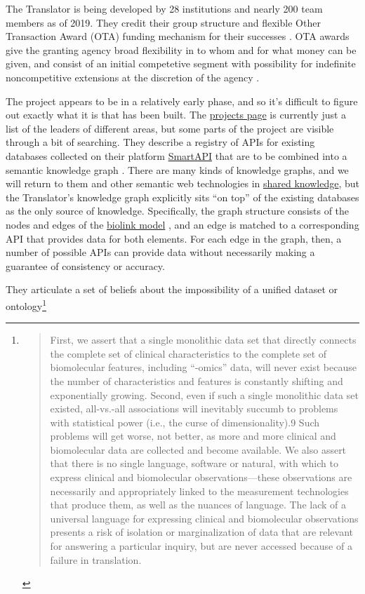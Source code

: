 \documentclass[10pt]{article}
\begin{document}
\begin{multicols}{2}
The Translator is being developed by 28 institutions and nearly 200 team
members as of 2019. They credit their group structure and flexible Other
Transaction Award (OTA) funding mechanism for their successes \cite{consortiumBiomedicalDataTranslator2019} . OTA awards give the
granting agency broad flexibility in to whom and for what money can be
given, and consist of an initial competetive segment with possibility
for indefinite noncompetitive extensions at the discretion of the agency
\cite{fleisherOtherTransactionAward2019} .

The project appears to be in a relatively early phase, and so it's
difficult to figure out exactly what it is that has been built. The
\href{https://web.archive.org/web/20211210023403/https://ncats.nih.gov/translator/projects}{projects
page} is currently just a list of the leaders of different areas, but
some parts of the project are visible through a bit of searching. They
describe a registry of APIs for existing databases collected on their
platform \href{https://smart-api.info/portal/translator}{SmartAPI} that
are to be combined into a semantic knowledge graph \cite{consortiumUniversalBiomedicalData2019} . There are many kinds of
knowledge graphs, and we will return to them and other semantic web
technologies in \protect\hyperlink{shared-knowledge}{shared knowledge},
but the Translator's knowledge graph explicitly sits ``on top'' of the
existing databases as the only source of knowledge. Specifically, the
graph structure consists of the nodes and edges of the
\href{https://github.com/biolink/biolink-model}{biolink model} \cite{bruskiewichBiolinkBiolinkmodel2021} , and an edge is matched to a
corresponding API that provides data for both elements. For each edge in
the graph, then, a number of possible APIs can provide data without
necessarily making a guarantee of consistency or accuracy.

They articulate a set of beliefs about the impossibility of a unified
dataset or ontology\footnote{\begin{quote}
  First, we assert that a single monolithic data set that directly
  connects the complete set of clinical characteristics to the complete
  set of biomolecular features, including ``-omics'' data, will never
  exist because the number of characteristics and features is constantly
  shifting and exponentially growing. Second, even if such a single
  monolithic data set existed, all-vs.-all associations will inevitably
  succumb to problems with statistical power (i.e., the curse of
  dimensionality).9 Such problems will get worse, not better, as more
  and more clinical and biomolecular data are collected and become
  available. We also assert that there is no single language, software
  or natural, with which to express clinical and biomolecular
  observations---these observations are necessarily and appropriately
  linked to the measurement technologies that produce them, as well as
  the nuances of language. The lack of a universal language for
  expressing clinical and biomolecular observations presents a risk of
  isolation or marginalization of data that are relevant for answering a
  particular inquiry, but are never accessed because of a failure in
  translation.


\end{quote}}
\end{multicols}
\end{document}

